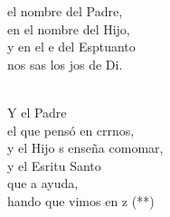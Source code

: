 \begin{cancion}%
	\begin{chorus}%
	 el nombre del Padre,  \\
en el nombre del Hijo,  \\
	y en el e del Esptuanto\\
	nos sas los jos de Di.\\
	\end{chorus}%
	\jump\\
	Y el Padre  \\
	el que pensó en crrnos,\\
	y el Hijo s enseña comomar, \\
	y el Esritu Santo  \\
	que  a ayuda,\\
	hando que vimos en z (**)\\
\end{cancion}%
